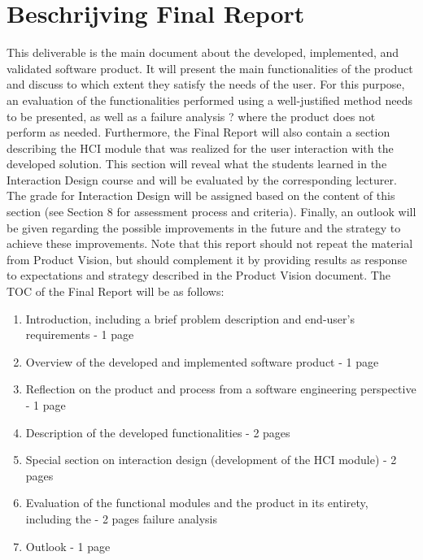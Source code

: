 \documentclass[a4paper]{article}
\begin{document}
\section{Beschrijving Final Report} \label{sec:Referentie}
This deliverable is the main document about the developed, implemented, and validated
software product. It will present the main functionalities of the product and discuss to which
extent they satisfy the needs of the user. For this purpose, an evaluation of the functionalities
performed using a well-justified method needs to be presented, as well as a failure analysis ?
where the product does not perform as needed. Furthermore, the Final Report will also
contain a section describing the HCI module that was realized for the user interaction with
the developed solution. This section will reveal what the students learned in the Interaction
Design course and will be evaluated by the corresponding lecturer. The grade for Interaction
Design will be assigned based on the content of this section (see Section 8 for assessment
process and criteria). Finally, an outlook will be given regarding the possible improvements in
the future and the strategy to achieve these improvements.
Note that this report should not repeat the material from Product Vision, but should
complement it by providing results as response to expectations and strategy described in the
Product Vision document. 
The TOC of the Final Report will be as follows:
\begin{enumerate}
\item Introduction, including a brief problem description and end-user's requirements - 1 page
\item Overview of the developed and implemented software product - 1 page
\item Reflection on the product and process from a software engineering perspective - 1 page
\item Description of the developed functionalities - 2 pages
\item Special section on interaction design (development of the HCI module) - 2 pages \label{itm:ite}
\item Evaluation of the functional modules and the product in its entirety, including the - 2 pages
failure analysis
\item Outlook - 1 page
\end{enumerate}
\end{document}
